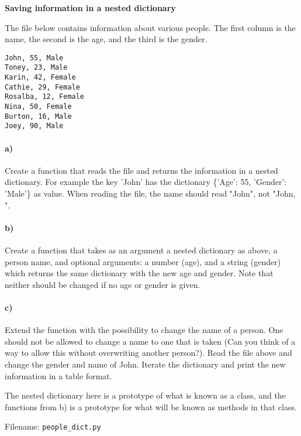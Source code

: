\newpage
\begin{Problem}{\textbf{Saving information in a nested dictionary}}\label{prob63}

\noindent The file below contains information about various people. The first column is
the name, the second is the age, and the third is the gender.
\begin{lstlisting}
John, 55, Male
Toney, 23, Male
Karin, 42, Female
Cathie, 29, Female
Rosalba, 12, Female
Nina, 50, Female
Burton, 16, Male
Joey, 90, Male
\end{lstlisting}
\paragraph{a)}
Create a function that reads the file and returns the information in a nested
dictionary. For example the key 'John' has the dictionary
\{'Age': 55, 'Gender': 'Male'\} as value.
When reading the file, the name should read "John", not "John, ".
\paragraph{b)}
Create a function that takes as an argument a nested dictionary as above,
a person name, and optional arguments: a
number (age), and a string (gender) which returns the same dictionary with the new
age and gender. Note that neither should be changed if no age or gender is given.
\paragraph{c)}
Extend the function with the possibility to change the name of a person. One should
not be allowed to change a name to one that is taken (Can you think of a way
to allow this without overwriting another person?).
Read the file above and change the gender and name of John. Iterate the dictionary
and print the new information in a table format.
\begin{remark}
The nested dictionary here is a prototype of what is known as a class, and the
functions from b) is a prototype for what will be known as methods in that
class.
\end{remark}

Filename: \texttt{people\_dict.py}
\end{Problem}

